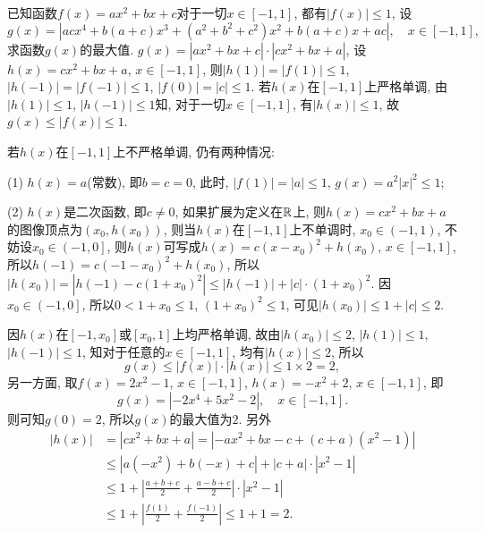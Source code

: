 \bq{}{}
已知函数$f\left(x\right)=ax^{2}+bx+c$对于一切$x\in\left[-1,1\right]$, 都有$\left|f\left(x\right)\right|\le1$,
设
\[
g\left(x\right)=\left|acx^{4}+b\left(a+c\right)x^{3}+\left(a^{2}+b^{2}+c^{2}\right)x^{2}+b\left(a+c\right)x+ac\right|,\quad x\in\left[-1,1\right],
\]
求函数$g\left(x\right)$的最大值.
\eq
\ba
$g\left(x\right)=\left|ax^{2}+bx+c\right|\cdot\left|cx^{2}+bx+a\right|$,
设$h\left(x\right)=cx^{2}+bx+a$, $x\in\left[-1,1\right]$, 则$\left|h\left(1\right)\right|=\left|f\left(1\right)\right|\le1$,
$\left|h\left(-1\right)\right|=\left|f\left(-1\right)\right|\le1$,
$\left|f\left(0\right)\right|=\left|c\right|\le1$. 若$h\left(x\right)$在$\left[-1,1\right]$上严格单调,
由$\left|h\left(1\right)\right|\le1$, $\left|h\left(-1\right)\right|\le1$知,
对于一切$x\in\left[-1,1\right]$, 有$\left|h\left(x\right)\right|\le1$,
故$g\left(x\right)\le\left|f(x)\right|\le1$.

若$h\left(x\right)$在$\left[-1,1\right]$上不严格单调, 仍有两种情况:

(1) $h\left(x\right)=a$(常数), 即$b=c=0$, 此时, $\left|f\left(1\right)\right|=\left|a\right|\le1$,
$g\left(x\right)=a^{2}\left|x\right|^2\le1$;

(2) $h\left(x\right)$是二次函数, 即$c\ne0$, 如果扩展为定义在$\mathbb{R}$上, 则$h\left(x\right)=cx^{2}+bx+a$的图像顶点为$\left(x_{0},h\left(x_{0}\right)\right)$,
则当$h\left(x\right)$在$\left[-1,1\right]$上不单调时, $x_{0}\in\left(-1,1\right)$,
不妨设$x_{0}\in\left(-1,0\right]$, 则$h\left(x\right)$可写成$h\left(x\right)=c\left(x-x_{0}\right)^{2}+h\left(x_{0}\right)$,
$x\in\left[-1,1\right]$, 所以$h\left(-1\right)=c\left(-1-x_{0}\right)^{2}+h\left(x_{0}\right)$,
所以$\left|h\left(x_{0}\right)\right|=\left|h\left(-1\right)-c\left(1+x_{0}\right)^{2}\right|\le\left|h\left(-1\right)\right|+\left|c\right|\cdot\left(1+x_{0}\right)^{2}$.
因$x_{0}\in\left(-1,0\right]$, 所以$0<1+x_{0}\le1$, $\left(1+x_{0}\right)^{2}\le1$,
可见$\left|h\left(x_{0}\right)\right|\le1+\left|c\right|\le2$. 

因$h\left(x\right)$在$\left[-1,x_{0}\right]$或$\left[x_{0},1\right]$上均严格单调,
故由$\left|h\left(x_{0}\right)\right|\le2$, $\left|h\left(1\right)\right|\le1$,
$\left|h\left(-1\right)\right|\le1$, 知对于任意的$x\in\left[-1,1\right]$,
均有$\left|h\left(x\right)\right|\le2$, 所以
\[
g\left(x\right)\le\left|f\left(x\right)\right|\cdot\left|h\left(x\right)\right|\le1\times2=2,
\]
另一方面, 取$f\left(x\right)=2x^{2}-1$, $x\in\left[-1,1\right]$, $h\left(x\right)=-x^{2}+2$,
$x\in\left[-1,1\right]$, 即
\[
g\left(x\right)=\left|-2x^{4}+5x^{2}-2\right|,\quad x\in\left[-1,1\right].
\]
则可知$g\left(0\right)=2$, 所以$g\left(x\right)$的最大值为$2$. 另外
\[
\begin{aligned}\left|h\left(x\right)\right| & =\left|cx^{2}+bx+a\right|=\left|-ax^{2}+bx-c+\left(c+a\right)\left(x^{2}-1\right)\right|\\
 & \le\left|a\left(-x^{2}\right)+b\left(-x\right)+c\right|+\left|c+a\right|\cdot\left|x^{2}-1\right|\\
 & \le1+\left|\frac{a+b+c}{2}+\frac{a-b+c}{2}\right|\cdot\left|x^{2}-1\right|\\
 & \le1+\left|\frac{f\left(1\right)}{2}+\frac{f\left(-1\right)}{2}\right|\le1+1=2.
\end{aligned}
\]
\ea

